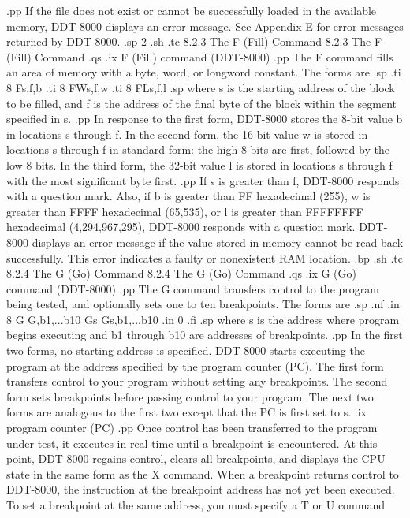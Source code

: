 .pp 
If the file does not exist or cannot be successfully loaded in the available 
memory, DDT-8000 displays an error message.  See Appendix E for error 
messages returned by DDT-8000.
.sp 2
.sh
.tc         8.2.3  The F (Fill) Command
8.2.3  The F (Fill) Command
.qs
.ix F (Fill) command (DDT-8000)
.pp 
The F command fills an area of memory with a byte, word, or longword 
constant.  The forms are
.sp
.ti 8
Fs,f,b
.ti 8
FWs,f,w
.ti 8
FLs,f,l
.sp
where s is the starting address of the block to be filled, and f is the 
address of the final byte of the block within the segment specified in s.
.pp 
In response to the first form, DDT-8000 stores the 8-bit value b in locations 
s through f.  In the second form, the 16-bit value w is stored in locations 
s through f in standard form: the high 8 bits are first, followed by the low 
8 bits.
In the third form, the 32-bit value l is stored in locations s through f with
the most significant byte first.
.pp 
If s is greater than f, DDT-8000 responds
with a question mark.  Also, if b is greater than FF hexadecimal (255), w 
is greater than FFFF hexadecimal (65,535), or l is greater than FFFFFFFF 
hexadecimal (4,294,967,295), DDT-8000 responds with a question mark.  DDT-8000 
displays an error message if the value stored in memory cannot be read back 
successfully.  This error indicates a faulty or nonexistent RAM location.
.bp 
.sh
.tc         8.2.4  The G (Go) Command
8.2.4  The G (Go) Command
.qs
.ix G (Go) command (DDT-8000)
.pp 
The G command transfers control to the program being tested, and optionally 
sets one to ten breakpoints.  The forms are
.sp
.nf
.in 8
G
G,b1,...b10
Gs
Gs,b1,...b10
.in 0
.fi
.sp
where s is the address where program begins executing and b1 through b10
are addresses of breakpoints.  
.pp 
In the first two forms, no starting address is specified.  DDT-8000 
starts executing the program at the address specified by the program counter 
(PC).  The first form transfers control to 
your program without setting any breakpoints.  The second form sets 
breakpoints before passing control to your program.  The next two forms are 
analogous to the first two except that the PC is first set to s.
.ix program counter (PC)
.pp 
Once control has been transferred to the program under test, it
executes in real time until a breakpoint is encountered.  At this
point, DDT-8000 regains control, clears all breakpoints, and
displays the CPU state in the same form as the X command.  When a
breakpoint returns control to DDT-8000, the instruction at the
breakpoint address has not yet been executed.  To set a 
breakpoint at the same address, you must specify a T or U command 
